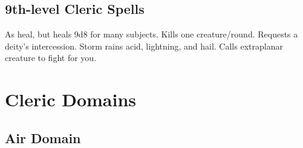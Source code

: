 \subsection{9th-level Cleric Spells}
\begin{spelllist}
   As heal, but heals 9d8 for many subjects.
   Kills one creature/round.
  \M Requests a deity's intercession.
   Storm rains acid, lightning, and hail.
   Calls extraplanar creature to fight for you.
\end{spelllist}

\section{Cleric Domains}  

\begin{comment}
\subsection{Example Domain}
\parhead{Domain Power}
\parhead{Channelled Domain Power}
\parhead{Greater Domain Power}
\parhead{Greater Channelled Domain Power}
\parhead{Domain Mastery}
\begin{spelllist}
  \spellhead[1]{}
  \spellhead[1]{}
  \spellhead[2]{}
  \spellhead[2]{}
  \spellhead[3]{}
  \spellhead[3]{}
  \spellhead[4]{}
  \spellhead[4]{}
  \spellhead[5]{}
  \spellhead[5]{}
  \spellhead[6]{}
  \spellhead[6]{}
  \spellhead[7]{}
  \spellhead[7]{}
  \spellhead[8]{}
  \spellhead[8]{}
  \spellhead[9]{}
  \spellhead[9]{}
\end{spelllist}
\end{comment}

\subsection{Air Domain}

